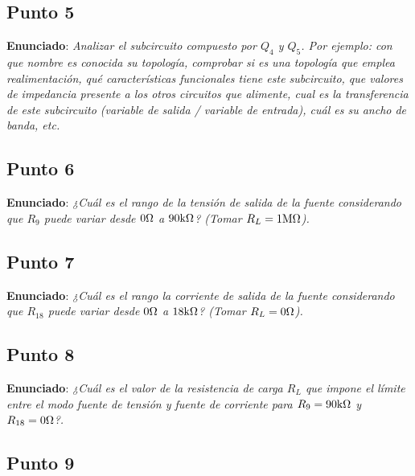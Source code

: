 

\subsection{Punto 5}

\textbf{Enunciado}: \textsl{Analizar el subcircuito compuesto por $Q_{4}$ y $Q_{5}$. Por ejemplo: con que nombre es conocida su topología, comprobar si es una topología que emplea realimentación, qué características funcionales tiene este subcircuito, que valores de impedancia presente a los otros circuitos que alimente, cual es la transferencia de este subcircuito (variable de salida / variable de entrada), cuál es su ancho de banda, etc.}



\subsection{Punto 6}

\textbf{Enunciado}: \textsl{¿Cuál es el rango de la tensión de salida de la fuente considerando que $R_{9}$ puede variar desde $0 \si[per-mode=symbol]{\ohm}$ a $90 \si[per-mode=symbol]{\kilo\ohm}$? (Tomar $R_{L} = 1 \si[per-mode=symbol]{\mega\ohm}$).}



\subsection{Punto 7}

\textbf{Enunciado}: \textsl{¿Cuál es el rango la corriente de salida de la fuente considerando que $R_{18}$ puede variar desde $0 \si[per-mode=symbol]{\ohm}$ a $18 \si[per-mode=symbol]{\kilo\ohm}$? (Tomar $R_{L} = 0 \si[per-mode=symbol]{\ohm}$).}



\subsection{Punto 8}

\textbf{Enunciado}: \textsl{¿Cuál es el valor de la resistencia de carga $R_{L}$ que impone el límite entre el modo fuente de tensión y fuente de corriente para $R_{9} = 90 \si[per-mode=symbol]{\kilo\ohm}$ y $R_{18} = 0 \si[per-mode=symbol]{\ohm}$?.}



\subsection{Punto 9}

